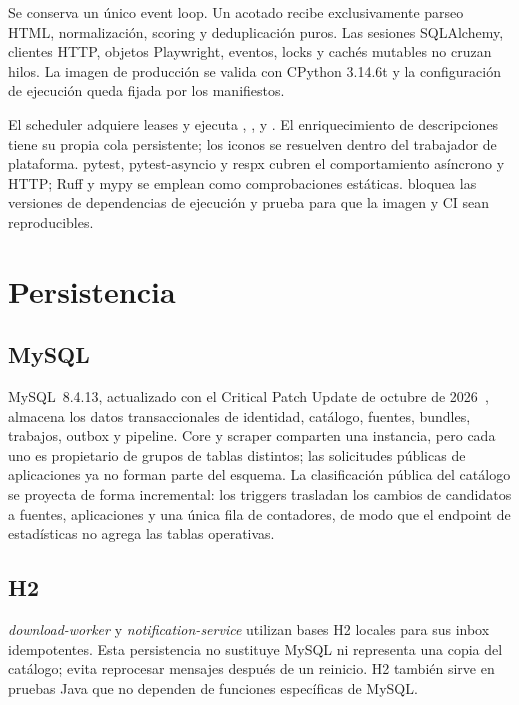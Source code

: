 Se conserva un único event loop. Un  acotado recibe exclusivamente parseo HTML, normalización, scoring y deduplicación puros. Las sesiones SQLAlchemy, clientes HTTP, objetos Playwright, eventos, locks y cachés mutables no cruzan hilos. La imagen de producción se valida con CPython 3.14.6t y la configuración de ejecución queda fijada por los manifiestos.

El scheduler adquiere leases y ejecuta , ,  y . El enriquecimiento de descripciones tiene su propia cola persistente; los iconos se resuelven dentro del trabajador de plataforma. pytest, pytest-asyncio y respx cubren el comportamiento asíncrono y HTTP; Ruff y mypy se emplean como comprobaciones estáticas.  bloquea las versiones de dependencias de ejecución y prueba para que la imagen y CI sean reproducibles.

\section{Persistencia}

\subsection{MySQL}

MySQL~8.4.13, actualizado con el Critical Patch Update de octubre de 2026~\cite{oracle-cpu-oct2026}, almacena los datos transaccionales de identidad, catálogo, fuentes, bundles, trabajos, outbox y pipeline. Core y scraper comparten una instancia, pero cada uno es propietario de grupos de tablas distintos; las solicitudes públicas de aplicaciones ya no forman parte del esquema. La clasificación pública del catálogo se proyecta de forma incremental: los triggers trasladan los cambios de candidatos a fuentes, aplicaciones y una única fila de contadores, de modo que el endpoint de estadísticas no agrega las tablas operativas.

\subsection{H2}

\emph{download-worker} y \emph{notification-service} utilizan bases H2 locales para sus inbox idempotentes. Esta persistencia no sustituye MySQL ni representa una copia del catálogo; evita reprocesar mensajes después de un reinicio. H2 también sirve en pruebas Java que no dependen de funciones específicas de MySQL.

